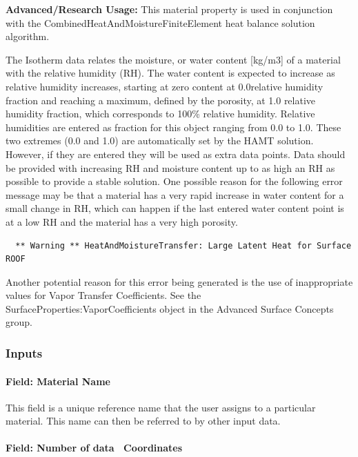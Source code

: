\textbf{Advanced/Research Usage:} This material property is used in conjunction with the CombinedHeatAndMoistureFiniteElement heat balance solution algorithm.

The Isotherm data relates the moisture, or water content {[}kg/m3{]} of a material with the relative humidity (RH). The water content is expected to increase as relative humidity increases, starting at zero content at 0.0relative humidity fraction and reaching a maximum, defined by the porosity, at 1.0 relative humidity fraction, which corresponds to 100\% relative humidity. Relative humidities are entered as fraction for this object ranging from 0.0 to 1.0. These two extremes (0.0 and 1.0) are automatically set by the HAMT solution. However, if they are entered they will be used as extra data points. Data should be provided with increasing RH and moisture content up to as high an RH as possible to provide a stable solution. One possible reason for the following error message may be that a material has a very rapid increase in water content for a small change in RH, which can happen if the last entered water content point is at a low RH and the material has a very high porosity.

\begin{lstlisting}
  ** Warning ** HeatAndMoistureTransfer: Large Latent Heat for Surface ROOF
\end{lstlisting}

Another potential reason for this error being generated is the use of inappropriate values for Vapor Transfer Coefficients. See the SurfaceProperties:VaporCoefficients object in the Advanced Surface Concepts group.

\subsubsection{Inputs}\label{inputs-8-024}

\paragraph{Field: Material Name}\label{field-material-name-1}

This field is a unique reference name that the user assigns to a particular material. This name can then be referred to by other input data.

\paragraph{Field: Number of data ~Coordinates}\label{field-number-of-data-coordinates}

